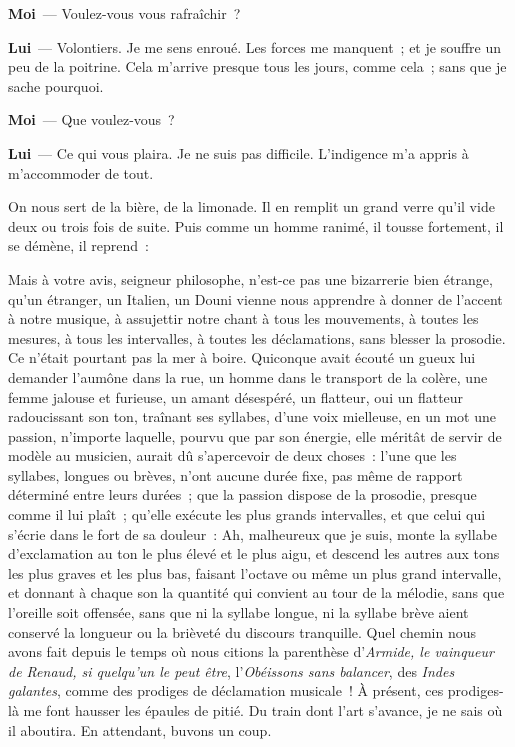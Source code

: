 \documentclass[french,twoside]{book} %
\newcommand{\labelchar}[1]{\textbf{\color{rubric} #1}}
\begin{document}
\labelchar{Moi} — Voulez-vous vous rafraîchir ?\par
\labelchar{Lui} — Volontiers. Je me sens enroué. Les forces me manquent ; et je souffre un peu de la poitrine. Cela m’arrive presque tous les jours, comme cela ; sans que je sache pourquoi.\par
\labelchar{Moi} — Que voulez-vous ?\par
\labelchar{Lui} — Ce qui vous plaira. Je ne suis pas difficile. L’indigence m’a appris à m’accommoder de tout.\par
On nous sert de la bière, de la limonade. Il en remplit un grand verre qu’il vide deux ou trois fois de suite. Puis comme un homme ranimé, il tousse fortement, il se démène, il reprend :\par
Mais à votre avis, seigneur philosophe, n’est-ce pas une bizarrerie bien étrange, qu’un étranger, un Italien, un Douni vienne nous apprendre à donner de l’accent à notre musique, à assujettir notre chant à tous les mouvements, à toutes les mesures, à tous les intervalles, à toutes les déclamations, sans blesser la prosodie. Ce n’était pourtant pas la mer à boire. Quiconque avait écouté un gueux lui demander l’aumône dans la rue, un homme dans le transport de la colère, une femme jalouse et furieuse, un amant désespéré, un flatteur, oui un flatteur radoucissant son ton, traînant ses syllabes, d’une voix mielleuse, en un mot une passion, n’importe laquelle, pourvu que par son énergie, elle méritât de servir de modèle au musicien, aurait dû s’apercevoir de deux choses : l’une que les syllabes, longues ou brèves, n’ont aucune durée fixe, pas même de rapport déterminé entre leurs durées ; que la passion dispose de la prosodie, presque comme il lui plaît ; qu’elle exécute les plus grands intervalles, et que celui qui s’écrie dans le fort de sa douleur : Ah, malheureux que je suis, monte la syllabe d’exclamation au ton le plus élevé et le plus aigu, et descend les autres aux tons les plus graves et les plus bas, faisant l’octave ou même un plus grand intervalle, et donnant à chaque son la quantité qui convient au tour de la mélodie, sans que l’oreille soit offensée, sans que ni la syllabe longue, ni la syllabe brève aient conservé la longueur ou la brièveté du discours tranquille. Quel chemin nous avons fait depuis le temps où nous citions la parenthèse d’\emph{Armide, le vainqueur de Renaud, si quelqu’un le peut être}, l’\emph{Obéissons sans balancer}, des \emph{Indes galantes}, comme des prodiges de déclamation musicale ! À présent, ces prodiges-là me font hausser les épaules de pitié. Du train dont l’art s’avance, je ne sais où il aboutira. En attendant, buvons un coup.\par
\end{document}
